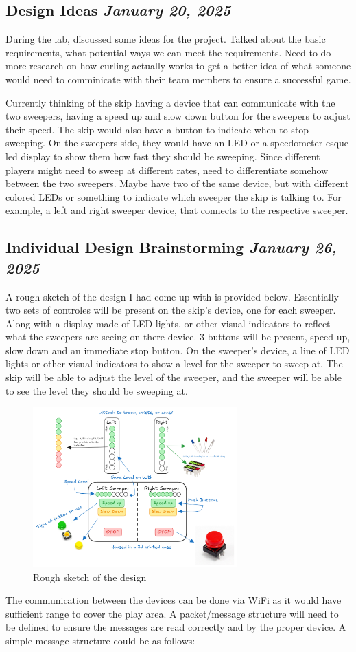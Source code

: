 \documentclass{article}
\newcommand{\logbookentry}[2]{
    \subsection*{#1 \hfill \textit{#2}} 
}
\begin{document}
\logbookentry{Design Ideas}{January 20, 2025}
During the lab, discussed some ideas for the project. Talked about the basic requirements, what potential ways we can meet the requirements. Need to do more research on how curling actually works to get a better idea of what someone would need to comminicate with their team members to ensure a successful game.

Currently thinking of the skip having a device that can communicate with the two sweepers, having a speed up and slow down button for the sweepers to adjust their speed. The skip would also have a button to indicate when to stop sweeping. On the sweepers side, they would have an LED or a speedometer esque led display to show them how fast they should be sweeping. Since different players might need to sweep at different rates, need to differentiate somehow between the two sweepers. Maybe have two of the same device, but with different colored LEDs or something to indicate which sweeper the skip is talking to. For example, a left and right sweeper device, that connects to the respective sweeper. 

\logbookentry{Individual Design Brainstorming}{January 26, 2025}
A rough sketch of the design I had come up with is provided below. Essentially two sets of controles will be present on the skip's device, one for each sweeper. Along with a display made of LED lights, or other visual indicators to reflect what the sweepers are seeing on there device. 3 buttons will be present, speed up, slow down and an immediate stop button. On the sweeper's device, a line of LED lights or other visual indicators to show a level for the sweeper to sweep at. The skip will be able to adjust the level of the sweeper, and the sweeper will be able to see the level they should be sweeping at.

\begin{figure}[ht!]
    \centering
    \includegraphics[width=0.7\textwidth]{design_idea1.png}
    \caption{Rough sketch of the design}
\end{figure}
\newpage
The communication between the devices can be done via WiFi as it would have sufficient range to cover the play area. A packet/message structure will need to be defined to ensure the messages are read correctly and by the proper device. A simple message structure could be as follows:
\end{document}
